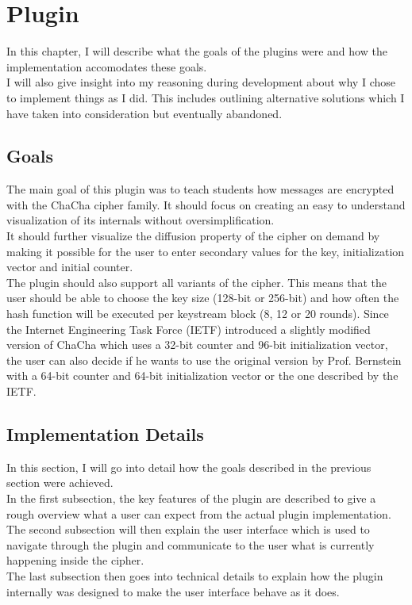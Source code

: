 %

\chapter{Plugin}
\label{chap:Plugin}

In this chapter, I will describe what the goals of the plugins were and how the implementation accomodates these goals.\\
I will also give insight into my reasoning during development about why I chose to implement things as I did. This includes outlining alternative solutions which I have taken into consideration but eventually abandoned.

\section{Goals}
\label{sec:goals}

The main goal of this plugin was to teach students how messages are encrypted with the ChaCha cipher family. It should focus on creating an easy to understand visualization of its internals without oversimplification. \\
It should further visualize the diffusion property of the cipher on demand by making it possible for the user to enter secondary values for the key, initialization vector and initial counter.\\
The plugin should also support all variants of the cipher. This means that the user should be able to choose the key size (128-bit or 256-bit) and how often the hash function will be executed per keystream block (8, 12 or 20 rounds). 
Since the Internet Engineering Task Force (IETF) introduced a slightly modified version of ChaCha which uses a 32-bit counter and 96-bit initialization vector, the user can also decide if he wants to use the original version by Prof. Bernstein with a 64-bit counter and 64-bit initialization vector or the one described by the IETF.

\section{Implementation Details}
\label{sec:implementationDetails}

In this section, I will go into detail how the goals described in the previous section were achieved. \\
In the first subsection, the key features of the plugin are described to give a rough overview what a user can expect from the actual plugin implementation. \\
The second subsection will then explain the user interface which is used to navigate through the plugin and communicate to the user what is currently happening inside the cipher. \\
The last subsection then goes into technical details to explain how the plugin internally was designed to make the user interface behave as it does.

